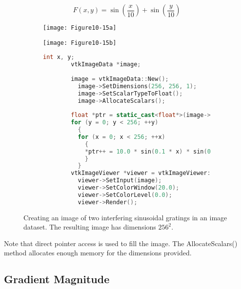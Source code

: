 \begin{equation}\label{eq:10.3}
F(x, y) = \sin\left(\frac{x}{10}\right) + \sin\left(\dfrac{y}{10}\right)
\end{equation}

\begin{figure}[htb]
    \centering
	\begin{subfigure}[h]{0.48\linewidth}
		\texttt{[image: Figure10-15a]}
		\captionsetup{justification=centering}
		\caption*{}
		\label{fig:Figure10-15a}
	\end{subfigure}
	\hfill
	\begin{subfigure}[h]{0.48\linewidth}
		\texttt{[image: Figure10-15b]}
		\captionsetup{justification=centering}
		\caption*{}
        \label{fig:Figure10-15b}
	\end{subfigure}
	\hfill
	\begin{subfigure}[h]{0.96\linewidth}
       \begin{lstlisting}[language=C++,  caption={}, numbers=none, frame=none]
        int x, y;
        vtkImageData *image;
        
        image = vtkImageData::New();
          image->SetDimensions(256, 256, 1);
          image->SetScalarTypeToFloat();
          image->AllocateScalars();
        
        float *ptr = static_cast<float*>(image->GetScalarPointer());
        for (y = 0; y < 256; ++y)
          {
          for (x = 0; x < 256; ++x)
            {
            *ptr++ = 10.0 * sin(0.1 * x) * sin(0.1 * y);
            }
          }
        vtkImageViewer *viewer = vtkImageViewer::New();
          viewer->SetInput(image);
          viewer->SetColorWindow(20.0);
          viewer->SetColorLevel(0.0);
          viewer->Render();
        \end{lstlisting}
        \label{fig:Figure10-15d}
	\end{subfigure}
	\caption{Creating an image of two interfering sinusoidal gratings in an image dataset. The resulting image has dimensions $256^2$.}\label{fig:Figure10-15}
\end{figure}

Note that direct pointer access is used to fill the image. The AllocateScalars() method allocates enough memory for the dimensions provided.

\subsection{Gradient Magnitude}


